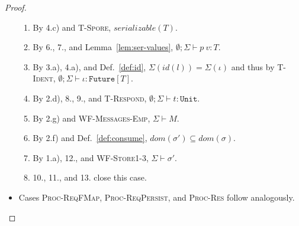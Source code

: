\begin{proof}
\begin{itemize}
\begin{enumerate}
\item By 4.c) and \textsc{T-Spore}, $serializable(T)$.
\item By 6., 7., and Lemma~\ref{lem:ser-values}, $\emptyset ; \Sigma \vdash p~v : T$.
\item By 3.a), 4.a), and Def.~\ref{def:id}, $\Sigma(id(l)) = \Sigma(\iota)$ and thus by \textsc{T-Ident}, $\emptyset ; \Sigma \vdash \iota : \texttt{Future}[T]$.
\item By 2.d), 8., 9., and \textsc{T-Respond}, $\emptyset ; \Sigma \vdash t : \texttt{Unit}$.
\item By 2.g) and \textsc{WF-Messages-Emp}, $\Sigma \vdash M$.
\item By 2.f) and Def.~\ref{def:consume}, $dom(\sigma') \subseteq dom(\sigma)$.
\item By 1.a), 12., and \textsc{WF-Store1-3}, $\Sigma \vdash \sigma'$.
\item 10., 11., and 13. close this case.
\end{enumerate}

\item Cases \textsc{Proc-ReqFMap}, \textsc{Proc-ReqPersist}, and \textsc{Proc-Res} follow analogously.

\end{itemize}
\end{proof}


